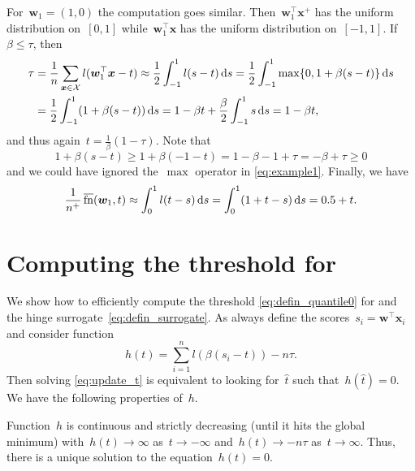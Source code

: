 For~$\bm{w}_1=(1,0)$ the computation goes similar. Then~$\bm{w}_1^\top \bm{x}^+$ has the uniform distribution on~$[0,1]$ while~$\bm{w}_1^\top \bm{x}$ has the uniform distribution on~$[-1,1]$. If~$\beta\le\tau$, then
\begin{equation}\label{eq:example1}
  \begin{aligned}
    \tau
    & = \frac{1}{n}\sum_{\bm{x} \in \mathcal{X}}l(\bm{w}_1^\top \bm{x}-t)
    \approx \frac{1}{2}\int_{-1}^1 l(s-t)\mathop{}\!\mathrm{d}s
      = \frac{1}{2}\int_{-1}^1 \max\{0,1+\beta(s-t)\}\mathop{}\!\mathrm{d}s \\
    & =\frac{1}{2}\int_{-1}^1 (1+\beta(s - t))\mathop{}\!\mathrm{d}s
      = 1 - \beta t + \frac{\beta}{2}\int_{-1}^1s\mathop{}\!\mathrm{d}s
      = 1 - \beta t,
  \end{aligned}
\end{equation}
and thus again~$t=\frac{1}{\beta}(1-\tau)$. Note that
\begin{equation*}
  1+\beta(s-t) \ge 1+\beta(-1-t) = 1-\beta - 1+\tau = -\beta+\tau \ge0
\end{equation*}
and we could have ignored the~$\max$ operator in \eqref{eq:example1}. Finally, we have
\begin{equation*}
  \frac{1}{n^+}\operatorname{\overline{fn}}(\bm{w}_1,t)
  \approx \int_0^1 l(t-s)\mathop{}\!\mathrm{d}s
  = \int_0^1 (1 + t - s)\mathop{}\!\mathrm{d}s
  = 0.5 + t.
\end{equation*}

\section{Computing the threshold for \PatMat}\label{app:threshold}

We show how to efficiently compute the threshold \eqref{eq:defin_quantile0} for \PatMat and the hinge surrogate~\eqref{eq:defin_surrogate}. As always define the scores~$s_i=\bm{w}^\top \bm{x}_i$ and consider function
\begin{equation}\label{eq:defin_h}
  h(t) = \sum_{i=1}^nl(\beta(s_i-t)) - n\tau.
\end{equation}
Then solving \eqref{eq:update_t} is equivalent to looking for~$\hat{t}$ such that~$h(\hat{t})=0$. We have the following properties of~$h$.

\begin{lemma}
  Function~$h$ is continuous and strictly decreasing (until it hits the global minimum) with~$h(t)\to \infty$ as~$t\to-\infty$ and~$h(t)\to -n\tau$ as~$t\to\infty$. Thus, there is a unique solution to the equation~$h(t)=0$.
\end{lemma}

